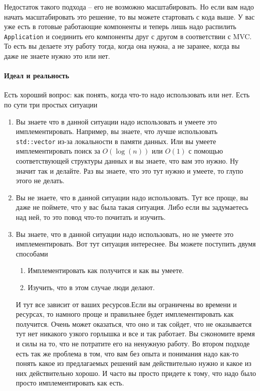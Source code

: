 Недостаток такого подхода -- его не возможно масштабировать.
Но если вам надо начать масштабировать это решение, то вы можете стартовать с кода выше.
У вас уже есть в готовые работающие компоненты и теперь лишь надо распилить \verb"Application" и соединить его компоненты  друг с другом в соответствии с MVC.
То есть вы делаете эту работу тогда, когда она нужна, а не заранее, когда вы даже не знаете нужно это или нет.

\paragraph{Идеал и реальность}

Есть хороший вопрос: как понять, когда что-то надо использовать или нет.
Есть по сути три простых ситуации
\begin{enumerate}
\item Вы знаете что в данной ситуации надо использовать и умеете это имплементировать.
Например, вы знаете, что лучше использовать \verb"std::vector" из-за локальности в памяти данных.
Или вы умеете имплементировать поиск за $O(\log(n))$ или $O(1)$ с помощью соответствующей структуры данных и вы знаете, что вам это нужно.
Ну значит так и делайте.
Раз вы знаете, что это тут нужно и умеете, то глупо этого не делать.

\item Вы не знаете, что в данной ситуации надо использовать.
Тут все проще, вы даже не поймете, что у вас была такая ситуация.
Либо если вы задумаетесь над ней, то это повод что-то почитать и изучить.

\item Вы знаете, что в данной ситуации надо использовать, но не умеете это имплементировать.
Вот тут ситуация интереснее.
Вы можете поступить двумя способами
\begin{enumerate}
\item Имплементировать как получится и как вы умеете.

\item Изучить, что в этом случае люди делают.
\end{enumerate}
И тут все зависит от ваших ресурсов.Если вы ограничены
 во времени и ресурсах, то намного проще и правильнее  будет имплементировать как получится.
Очень может оказаться, что оно и так сойдет, что не оказывается тут нет никакого узкого горлышка и все и так работает.
Вы сэкономите время и силы на то, что не потратите его на ненужную работу.
Во втором подходе есть так же проблема в том, что вам без опыта и понимания надо как-то понять какое из предлагаемых решений вам действительно нужно и какое из них действительно хорошо.
И часто вы просто придете к тому, что надо было просто имплементировать как есть.
\end{enumerate}
